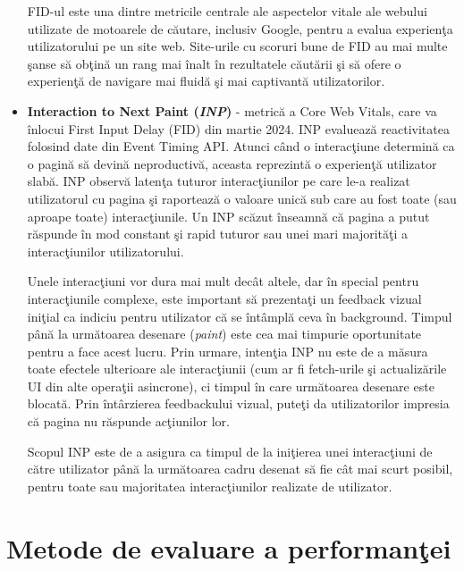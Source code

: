\documentclass[12pt, a4paper]{report}
\begin{document}
\begin{itemize}
	      FID-ul este una dintre metricile centrale ale aspectelor vitale ale webului utilizate de motoarele de c\u autare, inclusiv Google, pentru a evalua experien\c ta utilizatorului pe un site web. Site-urile cu scoruri bune de FID au mai multe \c sanse s\u a ob\c tin\u a un rang mai \^inalt \^in rezultatele c\u aut\u arii \c si s\u a ofere o experien\c t\u a de navigare mai fluid\u a \c si mai captivant\u a utilizatorilor.
	\item \textbf{Interaction to Next Paint (\emph{INP})} -  metric\u a a Core Web Vitals, care va \^inlocui First Input Delay (FID) din martie 2024. INP evalueaz\u a reactivitatea folosind date din Event Timing API. Atunci c\^and o interac\c tiune determin\u a ca o pagin\u a s\u a devin\u a neproductiv\u a, aceasta reprezint\u a o experien\c t\u a utilizator slab\u a. INP observ\u a laten\c ta tuturor interac\c tiunilor pe care le-a realizat utilizatorul cu pagina \c si raporteaz\u a o valoare unic\u a sub care au fost toate (sau aproape toate) interac\c tiunile. Un INP sc\u azut \^inseamn\u a c\u a pagina a putut r\u aspunde \^in mod constant \c si rapid tuturor sau unei mari majorit\u a\c ti a interac\c tiunilor utilizatorului.

	      Unele interac\c tiuni vor dura mai mult dec\^at altele, dar \^in special pentru interac\c tiunile complexe, este important s\u a prezenta\c ti un feedback vizual ini\c tial ca indiciu pentru utilizator c\u a se \^int\^ampl\u a ceva \^in background. Timpul p\^an\u a la urm\u atoarea desenare (\emph{paint}) este cea mai timpurie oportunitate pentru a face acest lucru. Prin urmare, inten\c tia INP nu este de a m\u asura toate efectele ulterioare ale interac\c tiunii (cum ar fi fetch-urile \c si actualiz\u arile UI din alte opera\c tii asincrone), ci timpul \^in care urm\u atoarea desenare este blocat\u a. Prin \^int\^arzierea feedbackului vizual, pute\c ti da utilizatorilor impresia c\u a pagina nu r\u aspunde ac\c tiunilor lor. \cite{inp}

	      Scopul INP este de a asigura ca timpul de la ini\c tierea unei interac\c tiuni de c\u atre utilizator p\^an\u a la urm\u atoarea cadru desenat s\u a fie c\^at mai scurt posibil, pentru toate sau majoritatea interac\c tiunilor realizate de utilizator.
\end{itemize}

\section{Metode de evaluare a performan\c tei}
\end{document}
